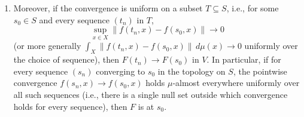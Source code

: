 \begin{theorem}
\begin{enumerate}
    \item Moreover, if the convergence is uniform on a subset $T \subseteq S$, i.e., for some $s_0 \in S$ and every sequence $(t_n)$ in $T$,
    $$\sup_{x \in X} \|f(t_n, x) - f(s_0, x)\| \to 0$$
    (or more generally $\int_X \|f(t_n, x) - f(s_0, x)\|\,d\mu(x) \to 0$ uniformly over the choice of sequence), then $F(t_n) \to F(s_0)$ in $V$. In particular, if for every sequence $(s_n)$ converging to $s_0$ in the topology on $S$, the pointwise convergence $f(s_n, x) \to f(s_0, x)$ holds $\mu$-almost everywhere uniformly over all such sequences (i.e., there is a single null set outside which convergence holds for every sequence), then $F$ is  at $s_0$.
\end{enumerate}
\end{theorem}

